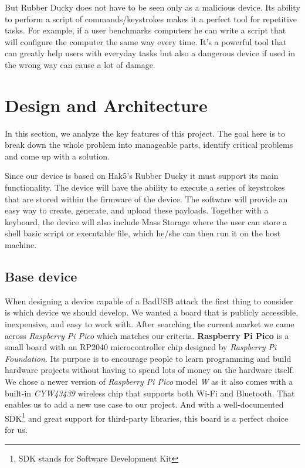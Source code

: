 But Rubber Ducky does not have to be seen only as a malicious device. Its ability to perform a script of commands/keystrokes makes it a perfect tool for repetitive tasks. For example, if a user benchmarks computers he can write a script that will configure the computer the same way every time. It's a powerful tool that can greatly help users with everyday tasks but also a dangerous device if used in the wrong way can cause a lot of damage.


\chapter{Design and Architecture}
\label{designAndArchitecture}
In this section, we analyze the key features of this project. The goal here is to break down the whole problem into manageable parts, identify critical problems and come up with a solution.

Since our device is based on Hak5's Rubber Ducky it must support its main functionality. The device will have the ability to execute a series of keystrokes that are stored within the firmware of the device. The software will provide an easy way to create, generate, and upload these payloads. Together with a keyboard, the device will also include Mass Storage where the user can store a shell basic script or executable file, which he/she can then run it on the host machine.

\section{Base device}
When designing a device capable of a BadUSB attack the first thing to consider is which device we should develop. We wanted a board that is publicly accessible, inexpensive, and easy to work with. After searching the current market we came across \emph{Raspberry Pi Pico} which matches our criteria. \textbf{Raspberry Pi Pico} is a small board with an RP2040 microcontroller chip designed by \emph{Raspberry Pi Foundation}. Its purpose is to encourage people to learn programming and build hardware projects without having to spend lots of money on the hardware itself. We chose a newer version of \emph{Raspberry Pi Pico} model \emph{W} as it also comes with a built-in \emph{CYW43439} wireless chip that supports both Wi-Fi and Bluetooth. That enables us to add a new use case to our project. And with a well-documented SDK\footnote{SDK stands for Software Development Kit} and great support for third-party libraries, this board is a perfect choice for us. 

